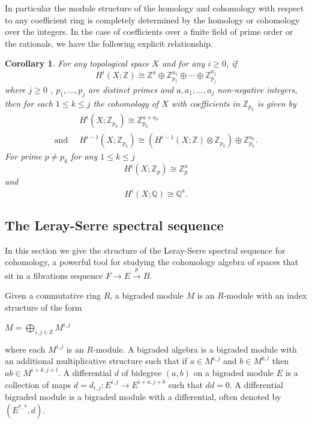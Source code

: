 \documentclass{article}
\theoremstyle{plain}
\newtheorem{cor}[thm]{Corollary}
\theoremstyle{definition}
\numberwithin{thm}{section}
\begin{document}
		In particular the module structure of the  homology and cohomology with respect to any coefficient ring
		is completely determined by the homology or cohomology over the integers.
		In the case of coefficients over a finite field of prime order or the rationals, we have the following explicit relationship.
		
		\begin{cor}\label{cor:UniversalModp}
			For any topological space $X$ and for any $i \geq 0$, if 
			\begin{equation*}
				H^i(X;\mathbb{Z})\cong \mathbb{Z}^a \oplus \mathbb{Z}_{p_1}^{a_1} \oplus \cdots \oplus \mathbb{Z}_{p_j}^{a_j}
			\end{equation*}
			where $j\geq 0$ , $p_1,\dots,p_j$ are distinct primes and $a,a_1,\dots,a_j$ non-negative integers,
			then for each $1\leq k \leq j$ the cohomology of $X$ with coefficients in $\mathbb{Z}_{p_k}$ is given by
			\begin{align*}
												&H^i(X;\mathbb{Z}_{p_k})\cong \mathbb{Z}_{p_k}^{a+a_k} \\
				\text{and} \;\; &H^{i-1}(X;\mathbb{Z}_{p_k})\cong (H^{i-1}(X;\mathbb{Z})\otimes \mathbb{Z}_{p_k}) \oplus \mathbb{Z}_{p_k}^{a_k}.
			\end{align*}
			For prime $p\neq p_k$ for any $1\leq k \leq j$
			\begin{equation*}
				H^i(X;\mathbb{Z}_p)\cong \mathbb{Z}_p^a
			\end{equation*}
			and
			\begin{equation*}
				H^i(X;\mathbb{Q})\cong \mathbb{Q}^a.
			\end{equation*}
		\end{cor}
	
	\subsection{The Leray-Serre spectral sequence}\label{sec:SpecSeq}
	
		In this section we give the structure of the Leray-Serre spectral sequence for cohomology,
		a powerful tool for studying the cohomology algebra of spaces that sit in a fibrations sequence $F\to E \xrightarrow{p} B$.
	
		Given a commutative ring $R$, a bigraded module $M$ is an $R$-module with an index structure of the form
		\begin{center}
			$M= {\bigoplus}_{i,j \in \mathbb{Z}} M^{i,j}$
		\end{center}
		where each $M^{i,j}$ is an $R$-module. 
		A {bigraded algebra} is a bigraded module with an additional multiplicative structure
		such that if $a \in M^{i,j}$ and $b\in M^{k,l}$ then $ab \in M^{i+k,j+l}$.
		A differential $d$ of {bidegree} $(a,b)$ on a bigraded module $E$ is a collection of maps
		$d=d_{i,j} \colon E^{i,j} \to E^{i+a,j+b}$ such that $dd=0$.
		A {differential bigraded module} is a bigraded module with a differential, often denoted by $(E^{*,*},d)$.
\end{document}
